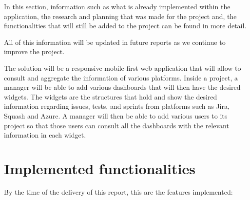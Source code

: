 \documentclass[a4paper,twoside,10pt]{report}
\begin{document}
In this section, information such as what is already implemented within the application, the research and planning that was made for the project and, the functionalities that will still be added to the project can be found in more detail.

All of this information will be updated in future reports as we continue to improve the project.


The solution will be a responsive mobile-first web application that will allow to consult and aggregate the information of various platforms. Inside a project, a manager will be able to add various dashboards that will then have the desired widgets. The widgets are the structures that hold and show the desired information regarding issues, tests, and sprints from platforms such as Jira\cite{JIRA}, Squash\cite{SQUASH} and Azure\cite{AZURE}. A manager will then be able to add various users to its project so that those users can consult all the dashboards with the relevant information in each widget.
\section{Implemented functionalities}
By the time of the delivery of this report, this are the features implemented:
 
\end{document}

